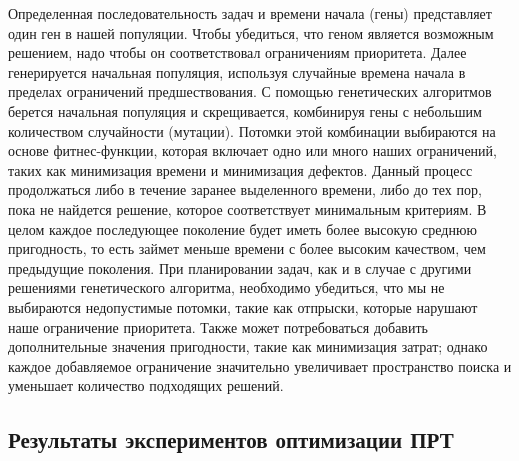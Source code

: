 Определенная последовательность задач и времени начала (гены) представляет один ген в нашей популяции. Чтобы убедиться, что геном является возможным решением, надо чтобы он соответствовал ограничениям приоритета. Далее генерируется начальная популяция, используя случайные времена начала в пределах ограничений предшествования. С помощью генетических алгоритмов берется начальная популяция и скрещивается, комбинируя гены с небольшим количеством случайности (мутации). Потомки этой комбинации выбираются на основе фитнес-функции, которая включает одно или много наших ограничений, таких как минимизация времени и минимизация дефектов. Данный процесс продолжаться либо в течение заранее выделенного времени, либо до тех пор, пока не найдется решение, которое соответствует минимальным критериям. В целом каждое последующее поколение будет иметь более высокую среднюю пригодность, то есть займет меньше времени с более высоким качеством, чем предыдущие поколения. При планировании задач, как и в случае с другими решениями генетического алгоритма, необходимо убедиться, что мы не выбираются недопустимые потомки, такие как отпрыски, которые нарушают наше ограничение приоритета. Также может потребоваться добавить дополнительные значения пригодности, такие как минимизация затрат; однако каждое добавляемое ограничение значительно увеличивает пространство поиска и уменьшает количество подходящих решений.

\subsection{Результаты экспериментов оптимизации ПРТ}
